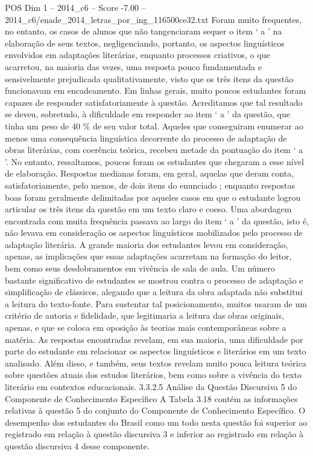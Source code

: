 \begin{textsample}{POS Dim 1 – 2014\_c6 – Score -7.00 – 2014\_c6/enade\_2014\_letras\_por\_ing\_116500ce32.txt}
Foram muito frequentes, no entanto, os casos de alunos que não tangenciaram sequer o item ‘ a ’ na elaboração de seus textos, negligenciando, portanto, os aspectos linguísticos envolvidos em adaptações literárias, enquanto processos criativos, o que acarretou, na maioria das vezes, uma resposta pouco fundamentada e sensivelmente prejudicada qualitativamente, visto que os três itens da questão funcionavam em encadeamento.
Em linhas gerais, muito poucos estudantes foram capazes de responder satisfatoriamente à questão.
Acreditamos que tal resultado se deveu, sobretudo, à dificuldade em responder ao item ‘ a ’ da questão, que tinha um peso de 40 \% de seu valor total.
Aqueles que conseguiram enumerar ao menos uma consequência linguística decorrente do processo de adaptação de obras literárias, com coerência teórica, recebeu metade da pontuação do item ‘ a ’.
No entanto, ressaltamos, poucos foram os estudantes que chegaram a esse nível de elaboração.
Respostas medianas foram, em geral, aquelas que deram conta, satisfatoriamente, pelo menos, de dois itens do enunciado ; enquanto respostas boas foram geralmente delimitadas por aqueles casos em que o estudante logrou articular os três itens da questão em um texto claro e coeso.
Uma abordagem encontrada com muita frequência passava ao largo do item ‘ a ’ da questão, isto é, não levava em consideração os aspectos linguísticos mobilizados pelo processo de adaptação literária.
A grande maioria dos estudantes levou em consideração, apenas, as implicações que essas adaptações acarretam na formação do leitor, bem como seus desdobramentos em vivência de sala de aula.
Um número bastante significativo de estudantes se mostrou contra o processo de adaptação e simplificação de clássicos, alegando que a leitura da obra adaptada não substitui a leitura do texto-fonte.
Para sustentar tal posicionamento, muitos usaram de um critério de autoria e fidelidade, que legitimaria a leitura das obras originais, apenas, e que se coloca em oposição às teorias mais contemporâneas sobre a matéria.
As respostas encontradas revelam, em sua maioria, uma dificuldade por parte do estudante em relacionar os aspectos linguísticos e literários em um texto analisado.
Além disso, e também, seus textos revelam muito pouca leitura teórica sobre questões atuais dos estudos literários, bem como sobre a vivência do texto literário em contextos educacionais. 3.3.2.5 Análise da Questão Discursiva 5 do Componente de Conhecimento Específico A Tabela 3.18 contém as informações relativas à questão 5 do conjunto do Componente de Conhecimento Específico.
O desempenho dos estudantes do Brasil como um todo nesta questão foi superior ao registrado em relação à questão discursiva 3 e inferior ao registrado em relação à questão discursiva 4 desse componente.

\end{textsample}
